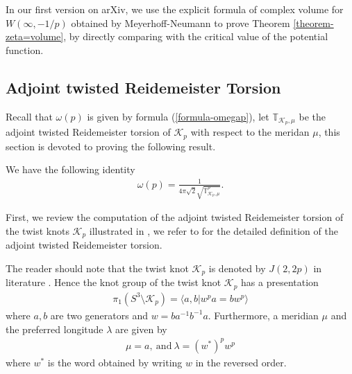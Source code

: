 \documentclass[12pt]{amsart}
\begin{document}
\begin{remark}
In our first version on arXiv, we use the explicit formula of complex volume for $W(\infty, -1/p)$ obtained by Meyerhoff-Neumann \cite{MeyNeu92} to prove Theorem \ref{theorem-zeta=volume}, by directly comparing with the critical value of the potential function.
\end{remark}




\subsection{Adjoint twisted Reidemeister Torsion}

Recall that $\omega(p)$ is given by formula (\ref{formula-omegap}), let $\mathbb{T}_{\mathcal{K}_p,\mu}$ be the adjoint twisted Reidemeister torsion of $\mathcal{K}_p$ with respect to the meridan $\mu$, this section is devoted to proving the following result.
\begin{theorem} \label{theorem-omega=Rtorsion}
We have the following identity   \begin{align}
   \omega(p)=
\frac{1}{4\pi\sqrt{2}\sqrt{\mathbb{T}_{\mathcal{K}_p,\mu}^\rho}}.
\end{align} 
\end{theorem}


First, we review the computation of the adjoint twisted Reidemeister torsion of the twist knots  $\mathcal{K}_p$ illustrated in \cite{DHY09, Tr14, Tr15, Tr16}, we refer to \cite{Porti97} for the detailed definition of the adjoint twisted Reidemeister torsion. 


The reader should  note that the twist knot  $\mathcal{K}_p$ is denoted by $J(2,2p)$ in literature \cite{HS05, DHY09,Tr14, Tr15, Tr16}. 
Hence the knot group of the twist knot $\mathcal{K}_p$ has a presentation 
\begin{align}
    \pi_1(S^3\setminus \mathcal{K}_p)=\langle a,b| w^pa=bw^p  \rangle
\end{align}
where $a,b$ are two generators and $w=ba^{-1}b^{-1}a$. Furthermore, a meridian $\mu$ and the preferred longitude $\lambda$ are given by 
\begin{align}
\mu=a,  \ \text{and} \ \lambda=(w^*)^pw^p    
\end{align}
 where $w^*$ is the word obtained by writing $w$ in the reversed order.
 
\end{document}
